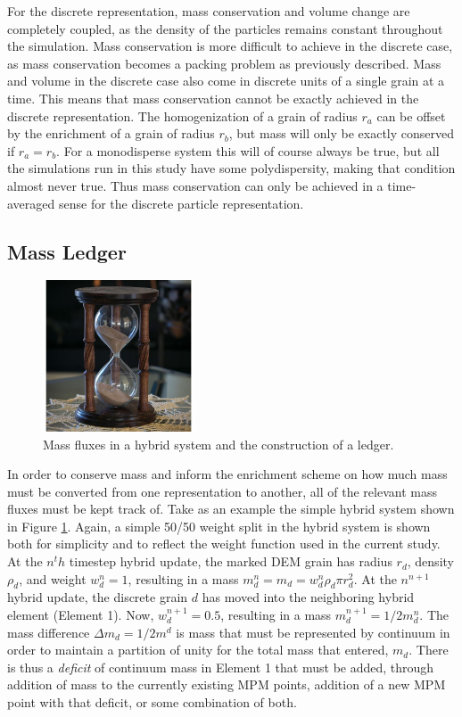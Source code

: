 For the discrete representation, mass conservation and volume change are completely coupled, as the density of the particles remains constant throughout the simulation. Mass conservation is more difficult to achieve in the discrete case, as mass conservation becomes a packing problem as previously described. Mass and volume in the discrete case also come in discrete units of a single grain at a time. This means that mass conservation cannot be exactly achieved in the discrete representation. The homogenization of a grain of radius $r_a$ can be offset by the enrichment of a grain of radius $r_b$, but mass will only be exactly conserved if $r_a = r_b$. For a monodisperse system this will of course always be true, but all the simulations run in this study have some polydispersity, making that condition almost never true. Thus mass conservation can only be achieved in a time-averaged sense for the discrete particle representation.

\subsection{Mass Ledger}

\begin{figure}[htp] 
    \centering
    \includegraphics[width=0.4\textwidth]{figs/hourglass_whole.jpg}
    \caption{Mass fluxes in a hybrid system and the construction of a ledger.}
    \label{mass_ledger_schematic}
\end{figure}

In order to conserve mass and inform the enrichment scheme on how much mass must be converted from one representation to another, all of the relevant mass fluxes must be kept track of. Take as an example the simple hybrid system shown in Figure \ref{mass_ledger_schematic}. Again, a simple 50/50 weight split in the hybrid system is shown both for simplicity and to reflect the weight function used in the current study. At the $n^th$ timestep hybrid update, the marked DEM grain has radius $r_d$, density $\rho_d$, and weight $w^n_d=1$, resulting in a mass $m^n_d=m_d=w^n_d\rho_d\pi r^2_d$. At the $n^{n+1}$ hybrid update, the discrete grain $d$ has moved into the neighboring hybrid element (Element 1). Now, $w^{n+1}_d=0.5$, resulting in a mass $m^{n+1}_d=1/2m^{n}_d$. The mass difference $\Delta m_d=1/2m^d$ is mass that must be represented by continuum in order to maintain a partition of unity for the total mass that entered, $m_d$. There is thus a \textit{deficit} of continuum mass in Element 1 that must be added, through addition of mass to the currently existing MPM points, addition of a new MPM point with that deficit, or some combination of both.

